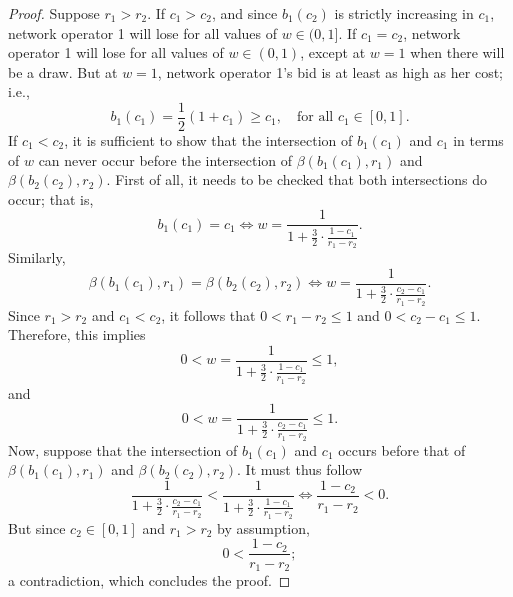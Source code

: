 \begin{proof}
Suppose $r_1>r_2$. If $c_1>c_2$, and since $b_1(c_2)$ is strictly increasing in $c_1$, network operator 1 will lose for all values of $w\in(0,1]$. If $c_1=c_2$, network operator 1 will lose for all values of $w\in(0,1)$, except at $w=1$ when there will be a draw. But at $w=1$, network operator 1's bid is at least as high as her cost; i.e.,
\begin{equation}
	b_1(c_1) = \frac{1}{2}(1+c_1) \ge c_1, \quad\text{for all } c_1\in[0,1].
\end{equation}
If $c_1<c_2$, it is sufficient to show that the intersection of $b_1(c_1)$ and $c_1$ in terms of $w$ can never occur before the intersection of $\beta(b_1(c_1),r_1)$ and $\beta(b_2(c_2),r_2)$. First of all, it needs to be checked that both intersections do occur; that is,
\begin{equation}
	b_1(c_1) = c_1 \iff w = \frac{1}{1 + \frac{3}{2}\cdot\frac{1 - c_1}{r_1 - r_2}}.
\end{equation}
Similarly,
\begin{equation}
	\beta(b_1(c_1),r_1) = \beta(b_2(c_2),r_2) \iff w = \frac{1}{1+ \frac{3}{2}\cdot\frac{c_2-c_1}{r_1-r_2}}.
\end{equation}
Since $r_1>r_2$ and $c_1<c_2$, it follows that $0<r_1-r_2\le 1$ and $0<c_2-c_1\le 1$. Therefore, this implies
\begin{equation}
	0 < w = \frac{1}{1+ \frac{3}{2}\cdot\frac{1-c_1}{r_1-r_2}} \le 1,
\end{equation}
and
\begin{equation}
	0 < w = \frac{1}{1+ \frac{3}{2}\cdot\frac{c_2-c_1}{r_1-r_2}} \le 1.
\end{equation}
Now, suppose that the intersection of $b_1(c_1)$ and $c_1$ occurs before that of $\beta(b_1(c_1),r_1)$ and $\beta(b_2(c_2),r_2)$. It must thus follow
\begin{equation}
	\frac{1}{1+\frac{3}{2}\cdot\frac{c_2-c_1}{r_1-r_2}} < \frac{1}{1+\frac{3}{2}\cdot\frac{1-c_1}{r_1-r_2}} \iff \frac{1-c_2}{r_1-r_2} < 0.
\end{equation}
But since $c_2\in[0,1]$ and $r_1>r_2$ by assumption,
\begin{equation}
	0 < \frac{1-c_2}{r_1-r_2};
\end{equation}
a contradiction, which concludes the proof.
\end{proof}

